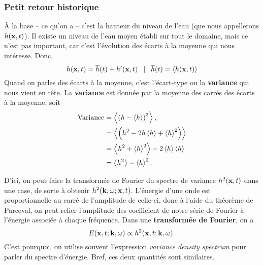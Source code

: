 \documentclass[10pt]{article}
\numberwithin{equation}{section}
\begin{document}
\subsubsection{Petit retour historique}
\label{sec:org4a6db0b}

À la base -- ce qu'on a -- c'est la hauteur du niveau de l'eau (que nous appellerons \(h(\vb{x},t)\)).
Il existe un niveau de l'eau moyen établi sur tout le domaine, mais ce n'est pas important, car c'est l'évolution des écarts à la moyenne qui nous intéresse.
Donc, 
\begin{equation}
   h(\vb{x},t) = \overline{h}(t) + h'(\vb{x},t) \enskip\mid\enskip \overline{h}(t) = \expval{h(\vb{x},t)}
\end{equation}
Quand on parles des écarts à la moyenne, c'est l'écart-type ou la \textbf{variance} qui nous vient en tête. 
La \textbf{variance} est donnée par la moyenne des carrés des écarts à la moyenne, soit
\begin{align}
   \mathrm{Variance} &= \expval{\qty(h - \expval{h})^2},\nonumber\\
   &= \expval{\qty(h^2 -2h\expval{h} + \expval{h}^2)}\\
   &= \expval{h^2 + \expval{h}^2} -2 \expval{h}\expval{h}\\
   &= \expval{h^2} - \expval{h}^2.
\end{align}

D'ici, on peut faire la transformée de Fourier du spectre de variance \(h^2(\vb{x},t)\) dans une case, de sorte à obtenir \(h^2(\vb{k}, \omega; \vb{x},t)\).
L'énergie d'une onde est proportionnelle au carré de l'amplitude de celle-ci, donc à l'aide du théorème de Parceval, on peut relier l'amplitude des coefficient de notre série de Fourier à l'énergie associée à chaque fréquence.
Dans une \textbf{transformée de Fourier}, on a 
\begin{equation}
   E(\vb{x},t; \vb{k},\omega) \propto h^2(\vb{x},t; \vb{k}, \omega).
\end{equation}
C'est pourquoi, on utilise souvent l'expression \emph{variance density spectrum} pour parler du spectre d'énergie.
Bref, ces deux quantités sont similaires.
\end{document}
